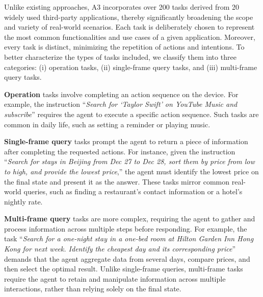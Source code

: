 \documentclass[11pt]{article}
\begin{document}



Unlike existing approaches, A3 incorporates over 200 tasks derived from 20 widely used third-party applications, thereby significantly broadening the scope and variety of real-world scenarios. Each task is deliberately chosen to represent the most common functionalities and use cases of a given application. Moreover, every task is distinct, minimizing the repetition of actions and intentions. To better characterize the types of tasks included, we classify them into three categories: (i) operation tasks, (ii) single-frame query tasks, and (iii) multi-frame query tasks.

\textbf{Operation} tasks involve completing an action sequence on the device. For example, the instruction ``\textit{Search for ‘Taylor Swift’ on YouTube Music and subscribe}'' requires the agent to execute a specific action sequence. Such tasks are common in daily life, such as setting a reminder or playing music.

\textbf{Single-frame query} tasks prompt the agent to return a piece of information after completing the requested actions. For instance, given the instruction ``\textit{Search for stays in Beijing from Dec 27 to Dec 28, sort them by price from low to high, and provide the lowest price},'' the agent must identify the lowest price on the final state and present it as the answer. These tasks mirror common real-world queries, such as finding a restaurant’s contact information or a hotel’s nightly rate.

\textbf{Multi-frame query} tasks are more complex, requiring the agent to gather and process information across multiple steps before responding. For example, the task ``\textit{Search for a one-night stay in a one-bed room at Hilton Garden Inn Hong Kong for next week. Identify the cheapest day and its corresponding price}'' demands that the agent aggregate data from several days, compare prices, and then select the optimal result. Unlike single-frame queries, multi-frame tasks require the agent to retain and manipulate information across multiple interactions, rather than relying solely on the final state.
\end{document}
